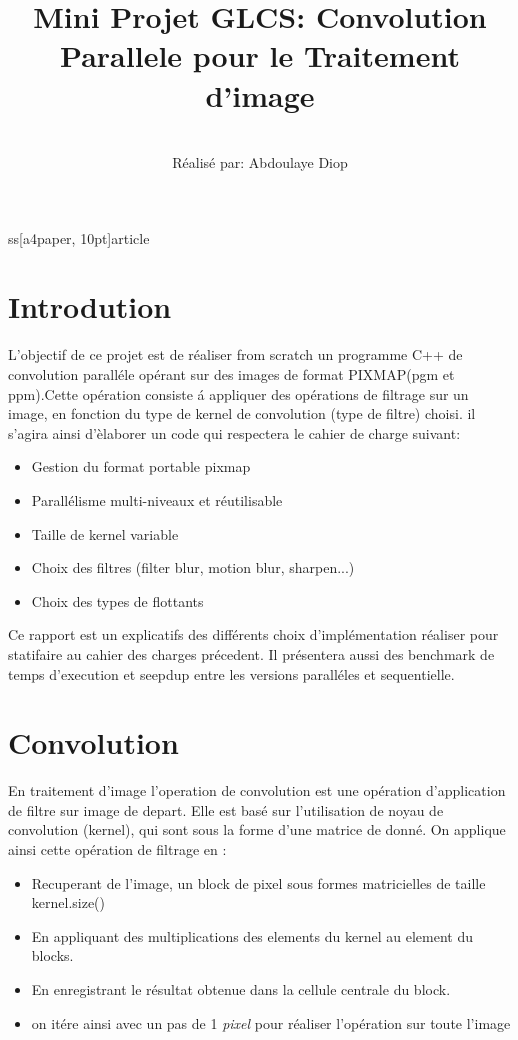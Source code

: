 ss[a4paper, 10pt]{article}
\usepackage[francais]{babel}
\usepackage{amsmath}
\usepackage{graphicx}
\title{\textbf{Mini Projet GLCS: Convolution Parallele pour le Traitement d'image}}

\author{\\
R\'ealis\'e par: Abdoulaye Diop\\
}
\date{}



\maketitle
\mbox{}
\cleardoublepage
\renewcommand{\contentsname}{Sommaire}
\tableofcontents

\cleardoublepage
\section{Introdution}
L'objectif de ce projet  est de r\'ealiser from scratch un programme C++ de convolution paralléle
op\'erant sur des images de format PIXMAP(pgm et ppm).Cette opération consiste \'a appliquer
des op\'erations de filtrage sur un image, en fonction du type de kernel de convolution (type de filtre) choisi.
il s'agira ainsi  d'\`elaborer un code qui respectera le cahier de charge suivant:
\begin{itemize}
\item Gestion du format portable pixmap
\item Parallélisme multi-niveaux et réutilisable
\item Taille de kernel variable
\item Choix des filtres (filter blur, motion blur, sharpen...)
\item Choix des types de flottants
\end{itemize}

Ce rapport est un explicatifs des différents choix d'implémentation réaliser pour statifaire au cahier des charges
pr\'ecedent. Il présentera aussi des benchmark de temps d'execution et seepdup entre les versions paralléles et
sequentielle.

\section{Convolution}
En traitement d'image l'operation de convolution est une opération d'application de filtre sur image de depart.
Elle est basé sur l'utilisation de noyau de convolution (kernel), qui sont sous la forme d'une 
matrice de donné.
On applique ainsi cette opération de filtrage en :
\begin{itemize}
\item Recuperant de l'image, un block de pixel sous formes matricielles de taille kernel.size()
\item En appliquant des multiplications des elements du kernel au element du blocks.
\item En enregistrant le résultat obtenue dans la cellule centrale du block.
\item on itére ainsi avec un pas de 1 {\it pixel} pour réaliser l'opération sur toute l'image
\end{itemize}

